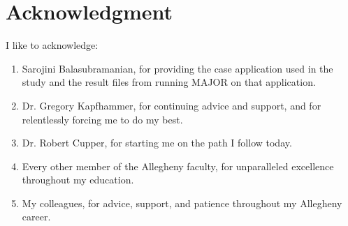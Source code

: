 \chapter*{Acknowledgment}\label{ch:ack}

I like to acknowledge:

\begin{enumerate}

\item[]
Sarojini Balasubramanian, for providing the case application used in the study and the result files from running MAJOR on that application.

\item[]
Dr. Gregory Kapfhammer, for continuing advice and support, and for relentlessly forcing me to do my best.

\item[]
Dr. Robert Cupper, for starting me on the path I follow today.

\item[]
Every other member of the Allegheny faculty, for unparalleled excellence throughout my education.

\item[]
My colleagues, for advice, support, and patience throughout my Allegheny career.

\end{enumerate}
